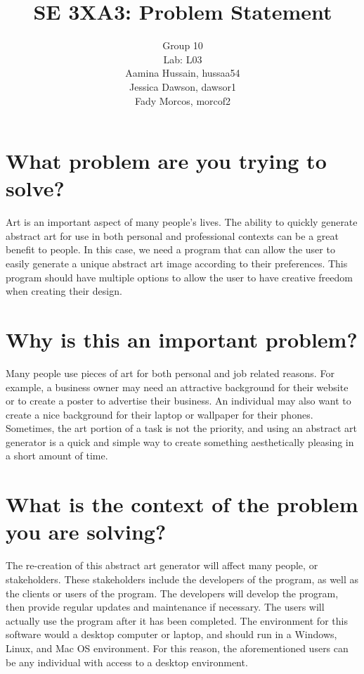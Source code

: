 \documentclass[12pt,letterpaper]{article}
\title{SE 3XA3: Problem Statement}
\author{Group 10 \\ Lab: L03 \\ Aamina Hussain, hussaa54 \\ Jessica Dawson, dawsor1 \\ Fady Morcos, morcof2}
\date{}
\begin{document}
\maketitle


\section{What problem are you trying to solve?}
Art is an important aspect of many people's lives. The ability to quickly generate abstract art for use in both personal and professional contexts can be a great benefit to people. In this case, we need a program that can allow the user to easily generate a unique abstract art image according to their preferences. This program should have multiple options to allow the user to have creative freedom when creating their design.

\section{Why is this an important problem?}
Many people use pieces of art for both personal and job related reasons. For example, a business owner may need an attractive background for their website or to create a poster to advertise their business. An individual may also want to create a nice background for their laptop or wallpaper for their phones. Sometimes, the art portion of a task is not the priority, and using an abstract art generator is a quick and simple way to create something aesthetically pleasing in a short amount of time.

\section{What is the context of the problem you are solving?}
The re-creation of this abstract art generator will affect many people, or stakeholders. These stakeholders include the developers of the program, as well as the clients or users of the program. The developers will develop the program, then provide regular updates and maintenance if necessary. The users will actually use the program after it has been completed. The environment for this software would a desktop computer or laptop, and should run in a Windows, Linux, and Mac OS environment. For this reason, the aforementioned users can be any individual with access to a desktop environment.
\end{document}
